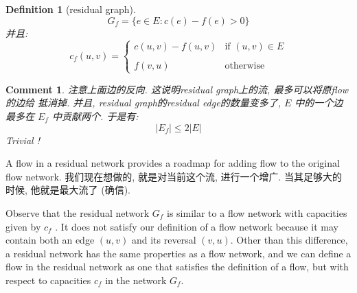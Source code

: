 \documentclass[a4paper, 10pt]{ctexart} %
\newtheorem{definition}{Definition}
\newtheorem{corollary}{Comment}
\begin{document}
\begin{definition}[residual graph]
$$ G_f = \{ e\in E : c(e) - f(e) > 0 \} $$
并且: 
$$ c_f \left(u ,v \right) = \begin{cases} c (u,v)  -f (u,v) & \text{if } \left(u ,v\right) \in E \\ \\ f \left( v, u\right) & \text{otherwise} \end{cases} $$
\end{definition}
\begin{corollary}
注意上面边的反向. 这说明residual 
graph上的流, 最多可以将原flow的边给
抵消掉. 
并且, residual graph的residual 
edge的数量变多了, $ E $ 中的一个边最多在 $ E_f $ 
中贡献两个. 于是有: 
$$ 
| E_f | \le 2 | E| 
$$
Trivial ! 
\end{corollary}

A flow in a residual network provides 
a roadmap for adding flow to the original
flow network. 我们现在想做的, 就是对当前这个流, 
进行一个增广. 当其足够大的
时候, 他就是最大流了 (确信). 

Observe that the residual network 
$ G_f $ is similar to a flow network 
with capacities
given by $ c_f $ . It does not satisfy 
our definition of a flow network because it may
contain both an edge $ (u,v) $ and 
its reversal $ (v,u) $. Other than 
this difference, a
residual network has the same properties 
as a flow network, and we can define a
flow in the residual network as one 
that satisfies the definition of a flow, but with
respect to capacities $ c_f $ 
in the network $ G_f $.
\end{document}
